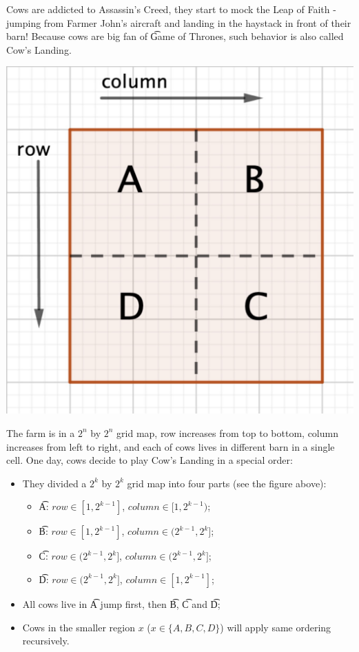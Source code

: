 Cows are addicted to Assassin's Creed, they start to mock the Leap of Faith -
jumping from Farmer John's aircraft and landing in the haystack in front of their barn!
Because cows are big fan of \t{Game of Thrones}, such behavior is also called Cow's Landing.

\begin{center}
  \includegraphics[scale=0.15, natwidth=1212, natheight=1212]{Quat.jpeg}
\end{center}

The farm is in a $2^n$ by $2^n$ grid map, row increases from top to bottom,
column increases from left to right,
and each of cows lives in different barn in a single cell.
One day, cows decide to play Cow's Landing in a special order:

\begin{itemize}
  \item They divided a $2^k$ by $2^k$ grid map into four parts (see the figure above):

  \begin{itemize}
    \item \t{A}: $row \in [1, 2^{k-1}]$, $column \in [1, 2^{k-1})$;
    \item \t{B}: $row \in [1, 2^{k-1}]$, $column \in (2^{k-1}, 2^{k}]$;
    \item \t{C}: $row \in (2^{k-1}, 2^{k}]$, $column \in (2^{k-1}, 2^k]$;
    \item \t{D}: $row \in (2^{k-1}, 2^k]$, $column \in [1, 2^{k-1}]$;
  \end{itemize}

  \item All cows live in \t{A} jump first, then \t{B}, \t{C} and \t{D};
  \item Cows in the smaller region $x$ ($x \in \{A,B,C,D\}$) will apply same ordering recursively.
\end{itemize}

